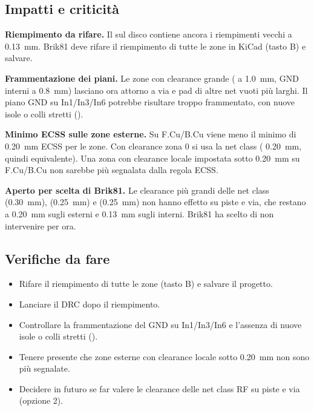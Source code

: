 \subsection{Impatti e criticità}
\begin{critbox}
\textbf{Riempimento da rifare.} Il  sul disco contiene ancora i riempimenti vecchi a \SI{0,13}{\milli\metre}. Brik81 deve rifare il riempimento di tutte le zone in KiCad (tasto B) e salvare.
\end{critbox}
\begin{critbox}
\textbf{Frammentazione dei piani.} Le zone con clearance grande ( a \SI{1,0}{\milli\metre}, GND interni a \SI{0,8}{\milli\metre}) lasciano ora attorno a via e pad di altre net vuoti più larghi. Il piano GND su In1/In3/In6 potrebbe risultare troppo frammentato, con nuove isole o colli stretti ().
\end{critbox}
\begin{notebox}
\textbf{Minimo ECSS sulle zone esterne.} Su F.Cu/B.Cu viene meno il minimo di \SI{0,20}{\milli\metre} ECSS per le zone. Con clearance zona 0 si usa la net class ( \SI{0,20}{\milli\metre}, quindi equivalente). Una zona con clearance locale impostata sotto \SI{0,20}{\milli\metre} su F.Cu/B.Cu non sarebbe più segnalata dalla regola ECSS.
\end{notebox}
\begin{critbox}
\textbf{Aperto per scelta di Brik81.} Le clearance più grandi delle net class  (\SI{0,30}{\milli\metre}),  (\SI{0,25}{\milli\metre}) e  (\SI{0,25}{\milli\metre}) non hanno effetto su piste e via, che restano a \SI{0,20}{\milli\metre} sugli esterni e \SI{0,13}{\milli\metre} sugli interni. Brik81 ha scelto di non intervenire per ora.
\end{critbox}

\subsection{Verifiche da fare}
\begin{itemize}
  \item Rifare il riempimento di tutte le zone (tasto B) e salvare il progetto.
  \item Lanciare il DRC dopo il riempimento.
  \item Controllare la frammentazione del GND su In1/In3/In6 e l'assenza di nuove isole o colli stretti ().
  \item Tenere presente che zone esterne con clearance locale sotto \SI{0,20}{\milli\metre} non sono più segnalate.
  \item Decidere in futuro se far valere le clearance delle net class RF su piste e via (opzione 2).
\end{itemize}
